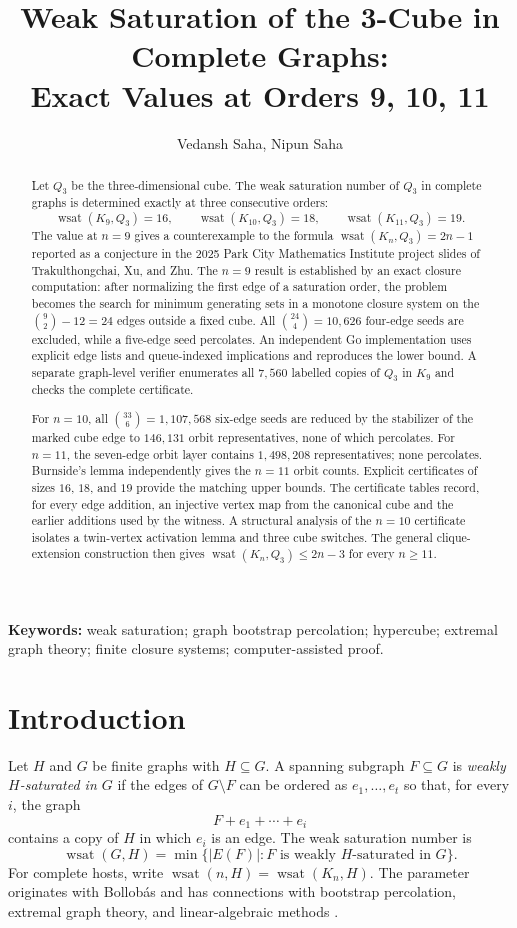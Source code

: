 \documentclass[11pt]{article}
\title{\textbf{Weak Saturation of the 3-Cube in Complete Graphs:\\ Exact Values at Orders 9, 10, 11}}
\author[1]{Vedansh Saha, Nipun Saha}
\affil[1]{Dhirubhai Ambani International School, Mumbai}
\date{}
\numberwithin{equation}{section}
\newcommand{\wsat}{\operatorname{wsat}}
\begin{document}
\maketitle

\begin{abstract}
Let $Q_3$ be the three-dimensional cube. The weak saturation number of $Q_3$ in complete graphs is determined exactly at three consecutive orders:
\[
\wsat(K_9,Q_3)=16,\qquad
\wsat(K_{10},Q_3)=18,\qquad
\wsat(K_{11},Q_3)=19.
\]
The value at $n=9$ gives a counterexample to the formula $\wsat(K_n,Q_3)=2n-1$ reported as a conjecture in the 2025 Park City Mathematics Institute project slides of Trakulthongchai, Xu, and Zhu. The $n=9$ result is established by an exact closure computation: after normalizing the first edge of a saturation order, the problem becomes the search for minimum generating sets in a monotone closure system on the $\binom92-12=24$ edges outside a fixed cube. All $\binom{24}{4}=10,626$ four-edge seeds are excluded, while a five-edge seed percolates. An independent Go implementation uses explicit edge lists and queue-indexed implications and reproduces the lower bound. A separate graph-level verifier enumerates all $7,560$ labelled copies of $Q_3$ in $K_9$ and checks the complete certificate.

For $n=10$, all $\binom{33}{6}=1,107,568$ six-edge seeds are reduced by the stabilizer of the marked cube edge to $146,131$ orbit representatives, none of which percolates. For $n=11$, the seven-edge orbit layer contains $1,498,208$ representatives; none percolates. Burnside's lemma independently gives the $n=11$ orbit counts. Explicit certificates of sizes $16$, $18$, and $19$ provide the matching upper bounds. The certificate tables record, for every edge addition, an injective vertex map from the canonical cube and the earlier additions used by the witness. A structural analysis of the $n=10$ certificate isolates a twin-vertex activation lemma and three cube switches. The general clique-extension construction then gives $\wsat(K_n,Q_3)\le 2n-3$ for every $n\ge11$.
\end{abstract}

\noindent\textbf{Keywords:} weak saturation; graph bootstrap percolation; hypercube; extremal graph theory; finite closure systems; computer-assisted proof.

\section{Introduction}
Let $H$ and $G$ be finite graphs with $H\subseteq G$. A spanning subgraph $F\subseteq G$ is \emph{weakly $H$-saturated in $G$} if the edges of $G\setminus F$ can be ordered as $e_1,\ldots,e_t$ so that, for every $i$, the graph
\[
F+e_1+\cdots+e_i
\]
contains a copy of $H$ in which $e_i$ is an edge. The weak saturation number is
\[
\wsat(G,H)=\min\{|E(F)|:F\text{ is weakly }H\text{-saturated in }G\}.
\]
For complete hosts, write $\wsat(n,H)=\wsat(K_n,H)$. The parameter originates with Bollob\'as \cite{Bollobas1968} and has connections with bootstrap percolation, extremal graph theory, and linear-algebraic methods \cite{Balogh2012,MNS2017,KMM2021}.
\end{document}
